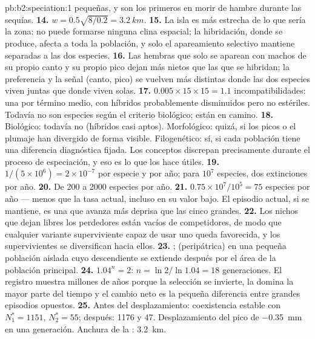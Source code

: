 \begin{solution}{pb:b2:speciation:1}
pequeñas, y son los primeros en morir de hambre durante las sequías.
\textbf{14.} $w = 0.5\sqrt{8/0.2} = \qty{3.2}{km}$.
\textbf{15.} La isla es más estrecha de lo que sería la zona: no puede
formarse ninguna clina espacial; la hibridación, donde se produce, afecta
a toda la población, y solo el apareamiento selectivo mantiene separadas
a las dos especies.
\textbf{16.} Las hembras que solo se aparean con machos de su propio canto
y su propio pico dejan más nietos que las que se hibridan; la preferencia
y la señal (canto, pico) se vuelven más distintas donde las dos especies
viven juntas que donde viven solas.
\textbf{17.} $0.005\times 15\times 15 = 1.1$ incompatibilidades: una por
término medio, con híbridos probablemente disminuidos pero no estériles.
Todavía no son especies según el criterio biológico; están en camino.
\textbf{18.} Biológico: todavía no (híbridos casi aptos). Morfológico:
quizá, si los picos o el plumaje han divergido de forma visible.
Filogenético: sí, si cada población tiene una diferencia diagnóstica
fijada. Los conceptos discrepan precisamente durante el proceso de
especiación, y eso es lo que los hace útiles.
\textbf{19.} $1/(5\times 10^{6}) = 2\times 10^{-7}$ por especie y por
año; para $10^{7}$ especies, dos extinciones por año.
\textbf{20.} De 200 a 2000 especies por año.
\textbf{21.} $0.75\times 10^{7}/10^{5} = 75$ especies por año --- menos
que la tasa actual, incluso en su valor bajo. El episodio actual, si se
mantiene, es una  que avanza más deprisa que las cinco
grandes.
\textbf{22.} Los nichos que dejan libres los perdedores están vacíos de
competidores, de modo que cualquier variante superviviente capaz de usar
uno queda favorecida, y los supervivientes se diversifican hacia ellos.
\textbf{23.} ;  (peripátrica) en
una pequeña población aislada cuyo descendiente se extiende después por el
área de la población principal.
\textbf{24.} $1.04^{n} = 2$: $n = \ln 2/\ln 1.04 = 18$ generaciones.
El registro muestra millones de años porque la selección se invierte, la
 domina la mayor parte del tiempo y el cambio neto
es la pequeña diferencia entre grandes episodios opuestos.
\textbf{25.} Antes del desplazamiento: coexistencia estable con $N_1^{*} =
1151$, $N_2^{*} = 55$; después: 1176 y 47. Desplazamiento del pico de
\qty{-0.35}{mm} en una generación. Anchura de la :
\qty{3.2}{km}.
\end{solution}
